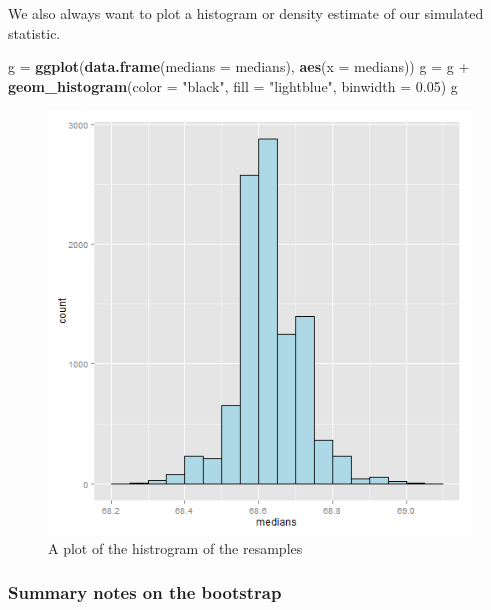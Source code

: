 \documentclass[]{article}
\newenvironment{Shaded}{\begin{snugshade}}{\end{snugshade}}
\newcommand{\KeywordTok}[1]{\textcolor[rgb]{0.13,0.29,0.53}{\textbf{{#1}}}}
\newcommand{\DataTypeTok}[1]{\textcolor[rgb]{0.13,0.29,0.53}{{#1}}}
\newcommand{\FloatTok}[1]{\textcolor[rgb]{0.00,0.00,0.81}{{#1}}}
\newcommand{\StringTok}[1]{\textcolor[rgb]{0.31,0.60,0.02}{{#1}}}
\newcommand{\NormalTok}[1]{{#1}}
\begin{document}
We also always want to plot a histogram or density estimate of our
simulated statistic.

\begin{Shaded}
\begin{Highlighting}[]
\NormalTok{g =}\StringTok{ }\KeywordTok{ggplot}\NormalTok{(}\KeywordTok{data.frame}\NormalTok{(}\DataTypeTok{medians =} \NormalTok{medians), }\KeywordTok{aes}\NormalTok{(}\DataTypeTok{x =} \NormalTok{medians))}
\NormalTok{g =}\StringTok{ }\NormalTok{g +}\StringTok{ }\KeywordTok{geom_histogram}\NormalTok{(}\DataTypeTok{color =} \StringTok{"black"}\NormalTok{, }\DataTypeTok{fill =} \StringTok{"lightblue"}\NormalTok{,}
                       \DataTypeTok{binwidth =} \FloatTok{0.05}\NormalTok{)}
\NormalTok{g}
\end{Highlighting}
\end{Shaded}

\begin{figure}[htbp]
\centering
\includegraphics{LeanPub/images/bootstrapping4-1.png}
\caption{A plot of the histrogram of the resamples}
\end{figure}

\subsubsection{Summary notes on the
bootstrap}\label{summary-notes-on-the-bootstrap}
\end{document}
